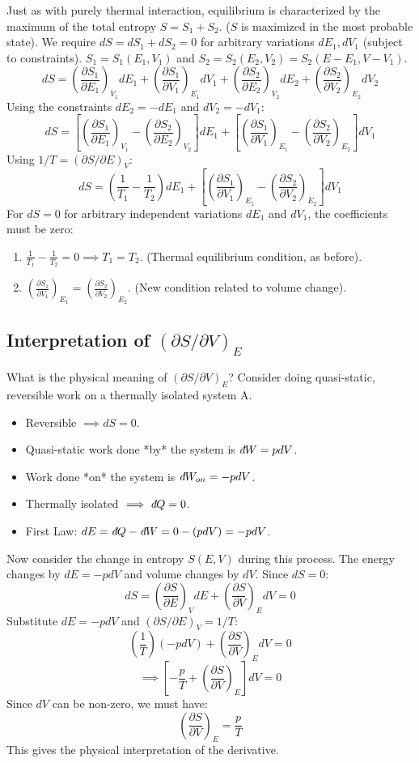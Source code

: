 \documentclass[11pt]{article}
\newcommand{\pderiv}[2]{\frac{\partial #1}{\partial #2}}
\newcommand{\ethbar}{\text{\it{đ}}} %
\begin{document}
Just as with purely thermal interaction, equilibrium is characterized by the maximum of the total entropy $S = S_1 + S_2$. ($S$ is maximized in the most probable state).
We require $dS = dS_1 + dS_2 = 0$ for arbitrary variations $dE_1, dV_1$ (subject to constraints).
$S_1 = S_1(E_1, V_1)$ and $S_2 = S_2(E_2, V_2) = S_2(E-E_1, V-V_1)$.
\[ dS = \left( \pderiv{S_1}{E_1} \right)_{V_1} dE_1 + \left( \pderiv{S_1}{V_1} \right)_{E_1} dV_1 + \left( \pderiv{S_2}{E_2} \right)_{V_2} dE_2 + \left( \pderiv{S_2}{V_2} \right)_{E_2} dV_2 \]
Using the constraints $dE_2 = -dE_1$ and $dV_2 = -dV_1$:
\[ dS = \left[ \left( \pderiv{S_1}{E_1} \right)_{V_1} - \left( \pderiv{S_2}{E_2} \right)_{V_2} \right] dE_1 + \left[ \left( \pderiv{S_1}{V_1} \right)_{E_1} - \left( \pderiv{S_2}{V_2} \right)_{E_2} \right] dV_1 \]
Using $1/T = (\partial S / \partial E)_V$:
\[ dS = \left( \frac{1}{T_1} - \frac{1}{T_2} \right) dE_1 + \left[ \left( \pderiv{S_1}{V_1} \right)_{E_1} - \left( \pderiv{S_2}{V_2} \right)_{E_2} \right] dV_1 \]
For $dS=0$ for arbitrary independent variations $dE_1$ and $dV_1$, the coefficients must be zero:
\begin{enumerate}
    \item $\frac{1}{T_1} - \frac{1}{T_2} = 0 \implies T_1 = T_2$. (Thermal equilibrium condition, as before).
    \item $\left( \pderiv{S_1}{V_1} \right)_{E_1} = \left( \pderiv{S_2}{V_2} \right)_{E_2}$. (New condition related to volume change).
\end{enumerate}

\subsection*{Interpretation of $(\partial S / \partial V)_E$}

What is the physical meaning of $(\partial S / \partial V)_E$?
Consider doing quasi-static, reversible work on a thermally isolated system A.
\begin{itemize}
    \item Reversible $\implies dS = 0$.
    \item Quasi-static work done *by* the system is $\ethbar W = p dV$.
    \item Work done *on* the system is $\ethbar W_{on} = -p dV$.
    \item Thermally isolated $\implies \ethbar Q = 0$.
    \item First Law: $dE = \ethbar Q - \ethbar W = 0 - (p dV) = -p dV$.
\end{itemize}
Now consider the change in entropy $S(E, V)$ during this process. The energy changes by $dE = -p dV$ and volume changes by $dV$. Since $dS=0$:
\[ dS = \left( \pderiv{S}{E} \right)_V dE + \left( \pderiv{S}{V} \right)_E dV = 0 \]
Substitute $dE = -p dV$ and $(\partial S / \partial E)_V = 1/T$:
\[ \left( \frac{1}{T} \right) (-p dV) + \left( \pderiv{S}{V} \right)_E dV = 0 \]
\[ \implies \left[ -\frac{p}{T} + \left( \pderiv{S}{V} \right)_E \right] dV = 0 \]
Since $dV$ can be non-zero, we must have:
\[ \left( \pderiv{S}{V} \right)_E = \frac{p}{T} \]
This gives the physical interpretation of the derivative.
\end{document}
